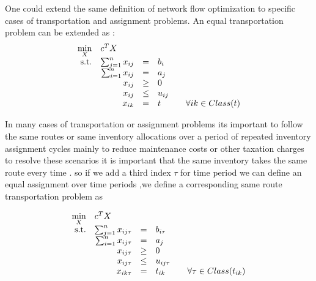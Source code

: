 \documentclass[a4paper]{article}
\begin{document}
    One could extend the same definition of network flow optimization to specific cases of transportation and assignment problems. An equal transportation problem can be extended as :
        \begin{equation}
        \begin{array}{rrclcl}
        \displaystyle \min_{X} & \multicolumn{3}{l}{c^T X} \\
        \textrm{s.t.} & \sum_{j=1}^n x_{ij}  & = & b_i \\
        & \sum_{i=1}^n x_{ij}  & = & a_j \\
        & x_{ij} & \geq & 0 & &  \\
        & x_{ij} & \leq & u_{ij} \\
        & x_{ik} &= & t && \forall {ik}\in Class(t)
        \end{array}
        \end{equation}
        
    In many cases of transportation or assignment problems its important to follow the same routes or same inventory allocations over a period of repeated inventory assignment cycles mainly to reduce maintenance costs or other taxation charges to resolve these scenarios it is important that the same inventory takes the same route every time . so if we add a third index  $\tau$ for time period we can define an equal assignment over time periods ,we define a corresponding same route transportation problem as

     \begin{equation}
        \begin{array}{rrclcl}
        \displaystyle \min_{X} & \multicolumn{3}{l}{c^T X} \\
        \textrm{s.t.} & \sum_{j=1}^n x_{ij\tau}  & = & b_{i\tau} \\
        & \sum_{i=1}^n x_{ij\tau}  & = & a_{j} \\
        & x_{ij\tau} & \geq & 0 & & \\
        & x_{ij\tau} & \leq & u_{ij\tau} \\
        & x_{ik\tau} &= & t_{ik} && \forall {\tau}\in Class(t_{ik}) \\
        \end{array}
        \end{equation}
\end{document}
